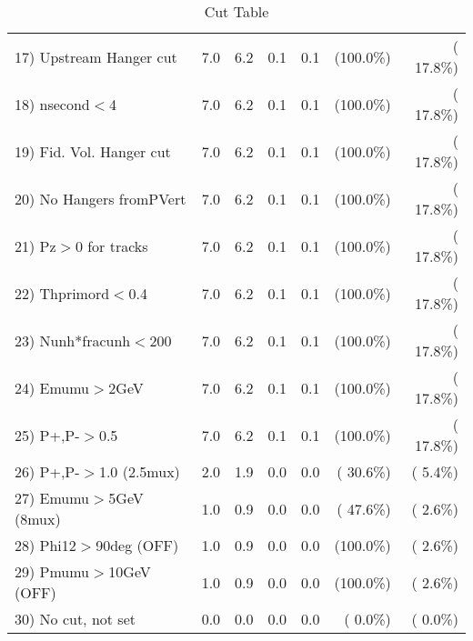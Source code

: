 \begin{table}[h!]
\begin{tabular}{||l||r|r|r|r|r|r||}
 17) Upstream Hanger cut  &          7.0 &          6.2 &          0.1 &          0.1 & (100.0\%) & ( 17.8\%) \\
 18) nsecond$<$4          &          7.0 &          6.2 &          0.1 &          0.1 & (100.0\%) & ( 17.8\%) \\
 19) Fid. Vol. Hanger cut &          7.0 &          6.2 &          0.1 &          0.1 & (100.0\%) & ( 17.8\%) \\
 20) No Hangers fromPVert &          7.0 &          6.2 &          0.1 &          0.1 & (100.0\%) & ( 17.8\%) \\
 21) Pz$>$0 for tracks    &          7.0 &          6.2 &          0.1 &          0.1 & (100.0\%) & ( 17.8\%) \\
 22) Thprimord$<$0.4      &          7.0 &          6.2 &          0.1 &          0.1 & (100.0\%) & ( 17.8\%) \\
 23) Nunh*fracunh$<$200   &          7.0 &          6.2 &          0.1 &          0.1 & (100.0\%) & ( 17.8\%) \\
 24) Emumu$>$2GeV         &          7.0 &          6.2 &          0.1 &          0.1 & (100.0\%) & ( 17.8\%) \\
 25) P+,P-$>$0.5          &          7.0 &          6.2 &          0.1 &          0.1 & (100.0\%) & ( 17.8\%) \\
 26) P+,P-$>$1.0 (2.5mux) &          2.0 &          1.9 &          0.0 &          0.0 & ( 30.6\%) & (  5.4\%) \\
 27) Emumu$>$5GeV  (8mux) &          1.0 &          0.9 &          0.0 &          0.0 & ( 47.6\%) & (  2.6\%) \\
 28) Phi12$>$90deg  (OFF) &          1.0 &          0.9 &          0.0 &          0.0 & (100.0\%) & (  2.6\%) \\
 29) Pmumu$>$10GeV  (OFF) &          1.0 &          0.9 &          0.0 &          0.0 & (100.0\%) & (  2.6\%) \\
 30) No cut, not set      &          0.0 &          0.0 &          0.0 &          0.0 & (  0.0\%) & (  0.0\%) \\
 \hline
 \hline
 \end{tabular}
 \caption{Cut Table           }
 \label{tab-cutheavy_neutrino_4.000}
 \end{table}
